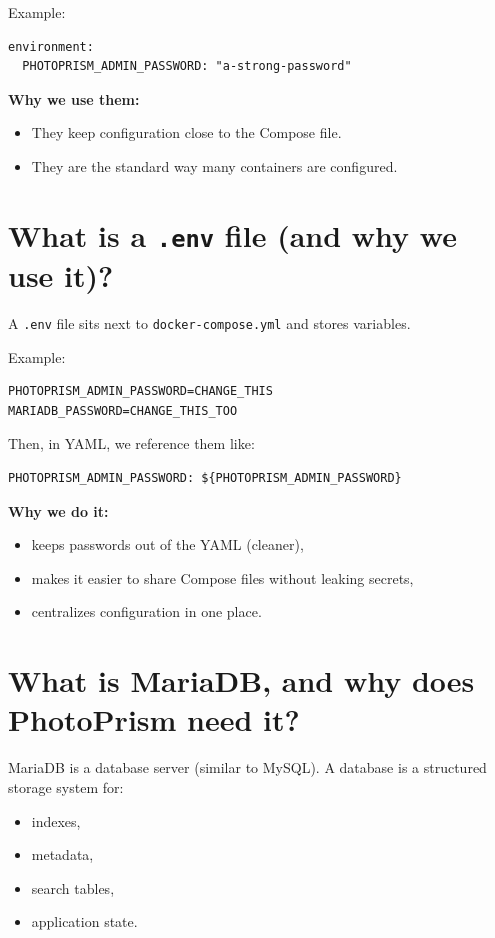 Example:
\begin{lstlisting}
environment:
  PHOTOPRISM_ADMIN_PASSWORD: "a-strong-password"
\end{lstlisting}

\textbf{Why we use them:}
\begin{itemize}[leftmargin=*]
  \item They keep configuration close to the Compose file.
  \item They are the standard way many containers are configured.
\end{itemize}

\section{What is a \texttt{.env} file (and why we use it)?}
A \texttt{.env} file sits next to \texttt{docker-compose.yml} and stores variables.

Example:
\begin{lstlisting}
PHOTOPRISM_ADMIN_PASSWORD=CHANGE_THIS
MARIADB_PASSWORD=CHANGE_THIS_TOO
\end{lstlisting}

Then, in YAML, we reference them like:
\begin{lstlisting}
PHOTOPRISM_ADMIN_PASSWORD: ${PHOTOPRISM_ADMIN_PASSWORD}
\end{lstlisting}

\textbf{Why we do it:}
\begin{itemize}[leftmargin=*]
  \item keeps passwords out of the YAML (cleaner),
  \item makes it easier to share Compose files without leaking secrets,
  \item centralizes configuration in one place.
\end{itemize}

\section{What is MariaDB, and why does PhotoPrism need it?}
MariaDB is a database server (similar to MySQL).
A database is a structured storage system for:
\begin{itemize}[leftmargin=*]
  \item indexes,
  \item metadata,
  \item search tables,
  \item application state.
\end{itemize}

